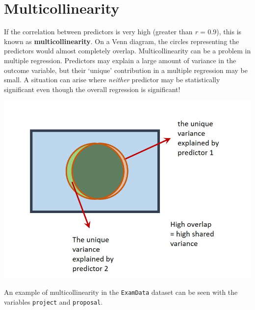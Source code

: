 \documentclass[
]{book}
\theoremstyle{definition}
\theoremstyle{definition}
\theoremstyle{definition}
\theoremstyle{definition}
\theoremstyle{remark}
\begin{document}
\hypertarget{multicollinearity}{%
\section{Multicollinearity}\label{multicollinearity}}

If the correlation between predictors is very high (greater than \emph{r} = 0.9), this is known as \textbf{multicollinearity}. On a Venn diagram, the circles representing the predictors would almost completely overlap. Multicollinearity can be a problem in multiple regression. Predictors may explain a large amount of variance in the outcome variable, but their `unique' contribution in a multiple regression may be small. A situation can arise where \emph{neither} predictor may be statistically significant even though the overall regression is significant!

\includegraphics{images/Venn_multi.jpg}

An example of multicollinearity in the \texttt{ExamData} dataset can be seen with the variables \texttt{project} and \texttt{proposal}.
\end{document}
